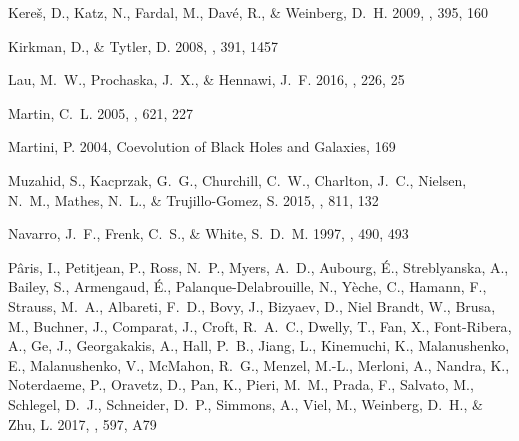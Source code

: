 \documentclass[iop]{emulateapj}
\begin{document}
{\begin{thebibliography}{52}
{Kere\v{s}}, D., {Katz}, N., {Fardal}, M., {Dav{\'e}}, R., \& {Weinberg}, D.~H.
  2009, \mnras, 395, 160

{Kirkman}, D., \& {Tytler}, D. 2008, \mnras, 391, 1457

{Lau}, M.~W., {Prochaska}, J.~X., \& {Hennawi}, J.~F. 2016, \apjs, 226, 25

{Martin}, C.~L. 2005, \apj, 621, 227

{Martini}, P. 2004, Coevolution of Black Holes and Galaxies, 169

{Muzahid}, S., {Kacprzak}, G.~G., {Churchill}, C.~W., {Charlton}, J.~C.,
  {Nielsen}, N.~M., {Mathes}, N.~L., \& {Trujillo-Gomez}, S. 2015, \apj, 811,
  132

{Navarro}, J.~F., {Frenk}, C.~S., \& {White}, S.~D.~M. 1997, \apj, 490, 493

{P{\^a}ris}, I., {Petitjean}, P., {Ross}, N.~P., {Myers}, A.~D., {Aubourg},
  {\'E}., {Streblyanska}, A., {Bailey}, S., {Armengaud}, {\'E}.,
  {Palanque-Delabrouille}, N., {Y{\`e}che}, C., {Hamann}, F., {Strauss}, M.~A.,
  {Albareti}, F.~D., {Bovy}, J., {Bizyaev}, D., {Niel Brandt}, W., {Brusa}, M.,
  {Buchner}, J., {Comparat}, J., {Croft}, R.~A.~C., {Dwelly}, T., {Fan}, X.,
  {Font-Ribera}, A., {Ge}, J., {Georgakakis}, A., {Hall}, P.~B., {Jiang}, L.,
  {Kinemuchi}, K., {Malanushenko}, E., {Malanushenko}, V., {McMahon}, R.~G.,
  {Menzel}, M.-L., {Merloni}, A., {Nandra}, K., {Noterdaeme}, P., {Oravetz},
  D., {Pan}, K., {Pieri}, M.~M., {Prada}, F., {Salvato}, M., {Schlegel}, D.~J.,
  {Schneider}, D.~P., {Simmons}, A., {Viel}, M., {Weinberg}, D.~H., \& {Zhu},
  L. 2017, \aap, 597, A79


\end{thebibliography}}
\end{document}
